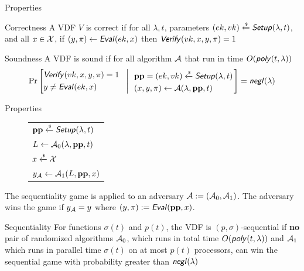 \documentclass[UTF8]{beamer}
\begin{document}
	\begin{frame}{Properties}
		\begin{block}{Correctness}
			A VDF $V$ is correct if for all $\lambda, t$, parameters $(ek,vk)\xleftarrow{\text{\tiny$\mathsf{\$}$}}\textsf{\textit{Setup}}(\lambda,t)$, and all $x\in\mathcal{X}$, if $(y,\pi)\gets\textsf{\textit{Eval}}(ek,x)$ then $\textsf{\textit{Verify}}(vk,x,y,\pi)=1$
		\end{block}
		\begin{block}{Soundness}
			A VDF is sound if for all algorithm $\mathcal{A}$ that run in time $O(\textsf{\textit{poly}}(t,\lambda))$
			\begin{equation*}
				\Pr\left[
				\begin{aligned}
					&\textsf{\textit{Verify}}(vk,x,y,\pi)=1\\
					&y\neq\textsf{\textit{Eval}}(ek,x)
				\end{aligned}
				~~\left|~~
				\begin{aligned}
					&\mathbf{pp}=(ek,vk)\xleftarrow{\text{\tiny$\mathsf{\$}$}}\textsf{\textit{Setup}}(\lambda, t)\\
					&(x,y,\pi)\gets\mathcal{A}(\lambda,\mathbf{pp},t)
				\end{aligned}
				\right.\right]=\textsf{\textit{negl}}(\lambda)
			\end{equation*}
		\end{block}
	\end{frame}
	\begin{frame}{Properties}
		\begin{figure}[h]
			\centering
			\begin{tabular}{|l|}
				\hline
				$\mathbf{pp}\xleftarrow{\text{\tiny$\mathsf{\$}$}}\textsf{\textit{Setup}}(\lambda,t)$\\
				$L\gets\mathcal{A}_0(\lambda,\mathbf{pp},t)$\\
				$x\xleftarrow{\text{\tiny$\mathsf{\$}$}}\mathcal{X}$\\
				$y_{\mathcal{A}}\gets\mathcal{A}_1(L,\mathbf{pp},x)$\\
				\hline
			\end{tabular}
		\end{figure}
		\begin{block}{}
			The sequentiality game is applied to an adversary $\mathcal{A}:=(\mathcal{A}_0,\mathcal{A}_1)$. The adversary wins the game if $y_{\mathcal{A}}=y$ where $(y,\pi):=\textsf{\textit{Eval}}(\mathbf{pp},x)$.
		\end{block}
		\begin{block}{Sequentiality}
			For functions $\sigma(t)$ and $p(t)$, the VDF is $(p,\sigma)$-sequential if \textbf{no} pair of randomized algorithms $\mathcal{A}_0$, which runs in total time $O(\textsf{\textit{poly}}(t,\lambda))$ and $\mathcal{A}_1$ which runs in parallel time $\sigma(t)$ on at most $p(t)$ processors, can win the sequential game with probability greater than $\textsf{\textit{negl}}(\lambda)$
		\end{block}
	\end{frame}
\end{document}
